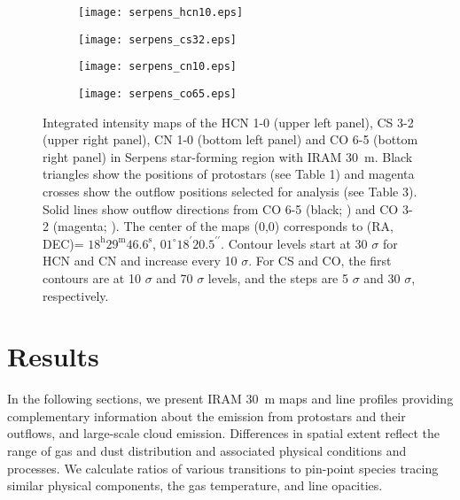 \documentclass{aa}
\begin{document}
\begin{figure*}
\centering 
\begin{subfigure}{.45\textwidth} \label{1map} 
\centering
\texttt{[image: serpens\_hcn10.eps]} 
\caption{} 
\end{subfigure}
\begin{subfigure}{.45\textwidth} 
\label{2map} 
\centering
\texttt{[image: serpens\_cs32.eps]} 
\caption{} 
\end{subfigure}
\begin{subfigure}{.45\textwidth} 
\label{3map} 
\centering
\texttt{[image: serpens\_cn10.eps]} 
\caption{} \end{subfigure}
\begin{subfigure}{.45\textwidth} 
\label{4map} 
\centering
\texttt{[image: serpens\_co65.eps]} 
\caption{} \end{subfigure}
\caption{\label{iram_maps} Integrated intensity maps of the HCN 1-0 (upper left panel), CS
3-2 (upper right panel), CN 1-0 (bottom left panel) and CO 6-5 (bottom right panel) in
Serpens star-forming region with IRAM 30~m. Black triangles show the positions of protostars
(see Table 1) and magenta crosses show the outflow positions selected for analysis (see Table 3). 
Solid lines show outflow directions from CO 6-5 (black; \citealt{Yil15}) and
 CO 3-2 (magenta; \citealt{Dio10}). The center of the maps (0,0) corresponds 
 to (RA, DEC)= $18^{\mathrm{h}} 29^{\mathrm{m}} 46.6^{\mathrm{s}}$, $01^{\circ}
18^{\prime} 20.5 ^{\prime\prime}$. Contour levels start at 30 $\sigma$
 for HCN and CN and increase every 10 $\sigma$. For CS and CO, the first contours 
are at 10 $\sigma$ and 70 $\sigma$ levels, and the steps are 5 $\sigma$ and 
30 $\sigma$, respectively.} 
\end{figure*}

\section{Results} 
In the following sections, we present IRAM 30~m maps and line profiles 
providing complementary information about the emission from 
protostars and their outflows, and large-scale cloud emission.
Differences in spatial extent reflect the range of gas and dust 
distribution and associated physical conditions and processes. 
We calculate ratios of various transitions to 
pin-point species tracing similar physical components, the gas temperature,
and line opacities. 
\end{document}
